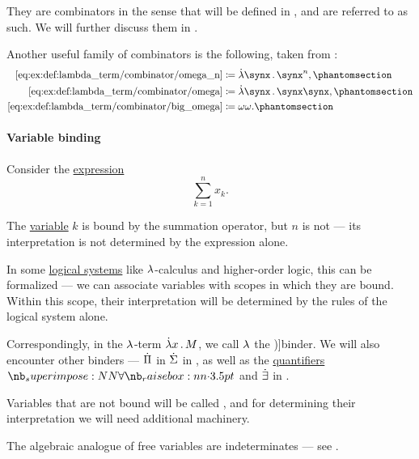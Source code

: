 \begin{example}
\begin{thmenum}
    They are combinators in the sense that will be defined in , and are referred to as such. We will further discuss them in .

    Another useful family of combinators is the following, taken from \cite[\S 3.1.21; \S 6.2.1]{Barendregt1984LambdaCalculus}:
    \begin{align*}
      \ref{eq:ex:def:lambda_term/combinator/omega_n}   &\coloneqq \qabs \synx \synx^n,     \taglabel[\ensuremath{ \omega_n }]{eq:ex:def:lambda_term/combinator/omega_n} \\
      \ref{eq:ex:def:lambda_term/combinator/omega}     &\coloneqq \qabs \synx \synx \synx, \taglabel[\ensuremath{ \omega }]{eq:ex:def:lambda_term/combinator/omega} \\
      \ref{eq:ex:def:lambda_term/combinator/big_omega} &\coloneqq \omega \omega.           \taglabel[\ensuremath{ \Omega }]{eq:ex:def:lambda_term/combinator/big_omega}
    \end{align*}
  \end{thmenum}
\end{example}

\paragraph{Variable binding}

\begin{concept}\label{con:variable_binding}
  Consider the \hyperref[con:expression]{expression}
  \begin{equation*}
    \sum_{k=1}^n x_k.
  \end{equation*}

  The \hyperref[con:variable]{variable} \( k \) is bound by the summation operator, but \( n \) is not --- its interpretation is not determined by the expression alone.

  In some \hyperref[con:logical_system]{logical systems} like \( {\mathrm \lambda} \)-calculus and higher-order logic, this can be formalized --- we can associate variables with scopes in which they are bound. Within this scope, their interpretation will be determined by the rules of the logical system alone.

  Correspondingly, in the \( {\mathrm \lambda} \)-term \( \qabs x M \), we call \( {\mathrm \lambda} \) the \term[en=binder (\cite[23]{UnivalentFoundationsProgram2024OctoberHoTT})]{binder}. We will also encounter other binders --- \( \dot{\Pi} \) in \( \dot{\Sigma} \) in , as well as the \hyperref[def:predicate_logic_alphabet/quantifiers]{quantifiers} \( \synforall \) and \( \dot{\exists} \) in .

  Variables that are not bound will be called , and for determining their interpretation we will need additional machinery.
\end{concept}
\begin{comments}
  \item The algebraic analogue of free variables are indeterminates --- see .
\end{comments}

